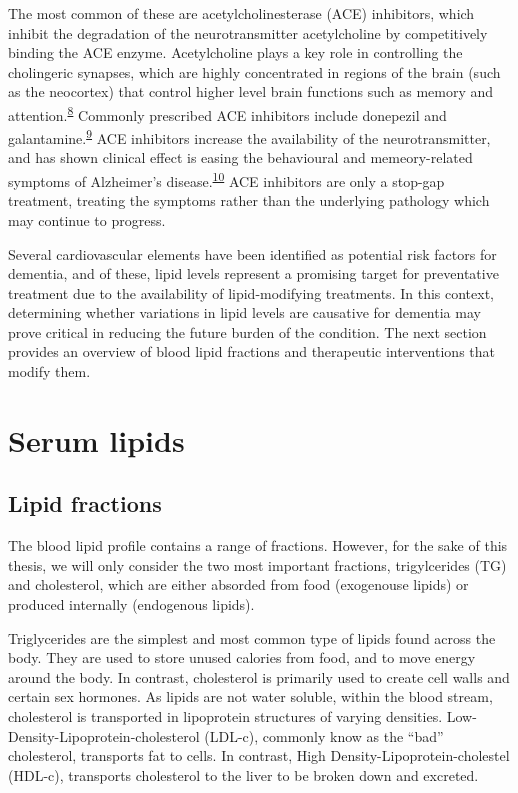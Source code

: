 \documentclass[a4paper, twoside]{templates/ociamthesis}
\begin{document}
The most common of these are acetylcholinesterase (ACE) inhibitors, which inhibit the degradation of the neurotransmitter acetylcholine by competitively binding the ACE enzyme. Acetylcholine plays a key role in controlling the cholingeric synapses, which are highly concentrated in regions of the brain (such as the neocortex) that control higher level brain functions such as memory and attention.\textsuperscript{\protect\hyperlink{ref-hampel2018}{8}} Commonly prescribed ACE inhibitors include donepezil and galantamine.\textsuperscript{\protect\hyperlink{ref-pariente2008}{9}} ACE inhibitors increase the availability of the neurotransmitter, and has shown clinical effect is easing the behavioural and memeory-related symptoms of Alzheimer's disease.\textsuperscript{\protect\hyperlink{ref-marucci2020}{10}} ACE inhibitors are only a stop-gap treatment, treating the symptoms rather than the underlying pathology which may continue to progress.

Several cardiovascular elements have been identified as potential risk factors for dementia, and of these, lipid levels represent a promising target for preventative treatment due to the availability of lipid-modifying treatments. In this context, determining whether variations in lipid levels are causative for dementia may prove critical in reducing the future burden of the condition. The next section provides an overview of blood lipid fractions and therapeutic interventions that modify them.

\hypertarget{serum-lipids}{%
\section{Serum lipids}\label{serum-lipids}}

\hypertarget{lipid-fractions}{%
\subsection{Lipid fractions}\label{lipid-fractions}}

The blood lipid profile contains a range of fractions. However, for the sake of this thesis, we will only consider the two most important fractions, trigylcerides (TG) and cholesterol, which are either absorded from food (exogenouse lipids) or produced internally (endogenous lipids).

Triglycerides are the simplest and most common type of lipids found across the body. They are used to store unused calories from food, and to move energy around the body. In contrast, cholesterol is primarily used to create cell walls and certain sex hormones. As lipids are not water soluble, within the blood stream, cholesterol is transported in lipoprotein structures of varying densities. Low-Density-Lipoprotein-cholesterol (LDL-c), commonly know as the ``bad'' cholesterol, transports fat to cells. In contrast, High Density-Lipoprotein-cholestel (HDL-c), transports cholesterol to the liver to be broken down and excreted.
\end{document}
